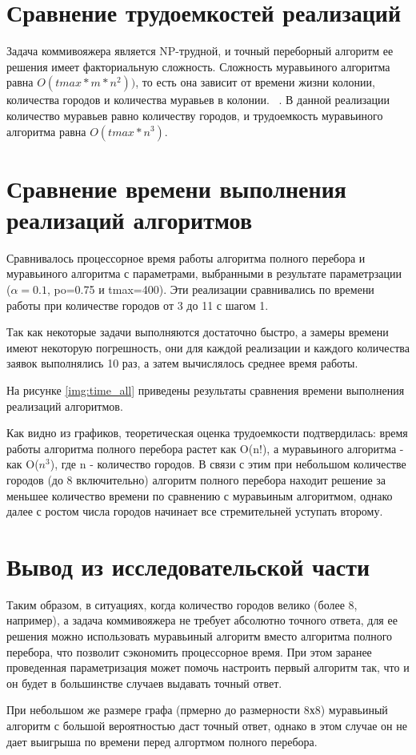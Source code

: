 \section{Сравнение трудоемкостей реализаций}

Задача коммивояжера является NP-трудной, и точный переборный алгоритм ее решения имеет факториальную сложность. Сложность муравьиного алгоритма равна $O(tmax*m*n^2))$, то есть она зависит от времени жизни колонии, количества городов и количества муравьев в колонии.  ~\cite{first_article}. В данной реализации количество муравьев равно количеству городов, и трудоемкость муравьиного алгоритма равна $O(tmax * n^3)$.

\section{Сравнение времени выполнения реализаций алгоритмов}

Сравнивалось процессорное время работы алгоритма полного перебора и муравьиного алгоритма с параметрами, выбранными в результате параметрзации ($\alpha=0.1$, po=0.75 и tmax=400). Эти реализации сравнивались по времени работы при количестве городов от 3 до 11 с шагом 1.
 
Так как некоторые задачи выполняются достаточно быстро, а замеры времени имеют некоторую погрешность, они для каждой реализации и каждого количества заявок выполнялись 10 раз, а затем вычислялось среднее время работы.
 

На рисунке \ref{img:time_all} приведены результаты сравнения времени выполнения реализаций алгоритмов. 

\clearpage
{}

Как видно из графиков, теоретическая оценка трудоемкости подтвердилась: время работы алгоритма полного перебора растет как O(n!), а муравьиного алгоритма - как O($n^3$), где n - количество городов. В связи с этим при небольшом количестве городов (до 8 включительно) алгоритм полного перебора находит решение за меньшее количество времени по сравнению с муравьиным алгоритмом, однако далее с ростом числа городов начинает все стремительней уступать второму.


\section{Вывод из исследовательской части}

Таким образом, в ситуациях, когда количество городов велико (более 8, например), а задача коммивояжера не требует абсолютно точного ответа, для ее решения можно использовать муравьиный алгоритм вместо алгоритма полного перебора, что позволит сэкономить процессорное время. При этом заранее проведенная параметризация может помочь настроить первый алгоритм так, что и он будет в большинстве случаев выдавать точный ответ. 

При небольшом же размере графа (прмерно до размерности 8х8) муравьиный алгоритм с большой вероятностью даст точный ответ, однако в этом случае он не дает выигрыша по времени перед алгортмом полного перебора.